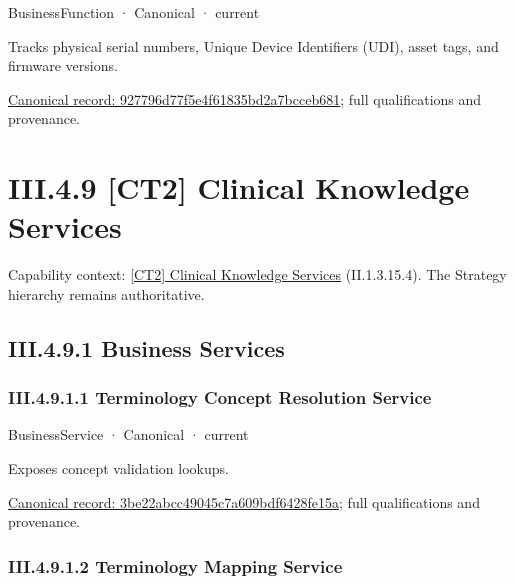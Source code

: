 \label{element:927796d77f5e4f61835bd2a7bcceb681}
{\small BusinessFunction · Canonical · current}\par

Tracks physical serial numbers, Unique Device Identifiers (UDI), asset tags, and firmware versions.


{\footnotesize \href{../../../../continuum/business/business-function/927796d77f5e4f61835bd2a7bcceb681.md}{Canonical record: 927796d77f5e4f61835bd2a7bcceb681}; full qualifications and provenance.}\par
\section*{III.4.9 [CT2] Clinical Knowledge Services}
\label{navigation:III.4.9}

{\small Capability context: \hyperref[element:bbd2bd21859f40e39963bdbe7a851686]{[CT2] Clinical Knowledge Services} (II.1.3.15.4). The Strategy hierarchy remains authoritative.}\par
\subsection*{III.4.9.1 Business Services}
\label{navigation:III.4.9.1}

\subsubsection*{III.4.9.1.1 Terminology Concept Resolution Service}
\label{navigation:III.4.9.1.1}

\label{element:3be22abcc49045c7a609bdf6428fe15a}
{\small BusinessService · Canonical · current}\par

Exposes concept validation lookups.


{\footnotesize \href{../../../../continuum/business/business-service/3be22abcc49045c7a609bdf6428fe15a.md}{Canonical record: 3be22abcc49045c7a609bdf6428fe15a}; full qualifications and provenance.}\par
\subsubsection*{III.4.9.1.2 Terminology Mapping Service}
\label{navigation:III.4.9.1.2}

